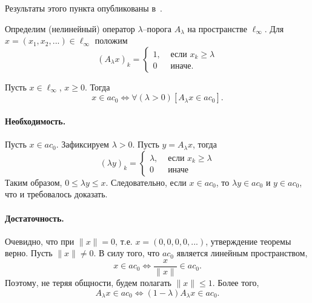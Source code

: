 Результаты этого пункта опубликованы в~\cite{our-mz2019ac0}.

Определим (нелинейный) оператор $\lambda$--порога $A_\lambda$ на пространстве $\ell_\infty$.
Для $x = (x_1, x_2, ...) \in \ell_\infty$ положим
\begin{equation}
	(A_\lambda x)_k = \begin{cases}
		1, & \mbox{~если~} x_k \geq \lambda
		\\
		0  & \mbox{~иначе.~}
	\end{cases}
\end{equation}

\begin{theorem}
	Пусть $x\in\ell_\infty$, $x\geq 0$.
	Тогда
	\begin{equation}
		x\in ac_0 \Leftrightarrow
		\forall(\lambda>0)[A_\lambda x \in ac_0]
		.
	\end{equation}
\end{theorem}

\paragraph{Необходимость.}
Пусть $x\in ac_0$.
Зафиксируем $\lambda > 0$.
Пусть $y=A_\lambda x$, тогда
\begin{equation}
	(\lambda y)_k = \begin{cases}
		\lambda, & \mbox{~если~} x_k \geq \lambda
		\\
		0  & \mbox{~иначе~}
	\end{cases}
\end{equation}
Таким образом, $0 \leq \lambda y \leq x$.
Следовательно, если $x \in ac_0$,
то $\lambda y \in ac_0$ и $y \in ac_0$,
что и требовалось доказать.

\paragraph{Достаточность.}
Очевидно, что при $\|x\| = 0$, т.е. $x = (0,0,0,0,...)$,
утверждение теоремы верно.
Пусть $\|x\| \ne 0$.
В силу того, что $ac_0$ является линейным пространством,
\begin{equation}
	x\in ac_0 \Leftrightarrow
	\frac{x}{\|x\|}\in ac_0
	.
\end{equation}
Поэтому, не теряя общности, будем полагать $\|x\|\leq 1$.
Более того,
\begin{equation}
	A_\lambda x \in ac_0 \Leftrightarrow
	(1-\lambda)A_\lambda x \in ac_0
	.
\end{equation}

